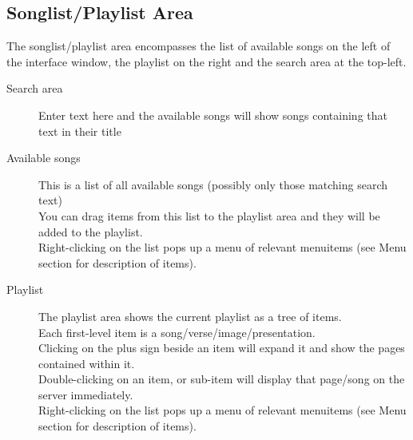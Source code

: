 \documentclass[11pt,twoside]{book}
\begin{document}
\subsection{Songlist/Playlist Area}
	The songlist/playlist area encompasses the list of available songs on the left of the interface window, the playlist on the right and the search area at the top-left.
	\begin{description}
		\item[Search area] Enter text here and the available songs will show songs containing that text in their title
		\item[Available songs] This is a list of all available songs (possibly only those matching search text)\\
			You can drag items from this list to the playlist area and they will be added to the playlist.\\
			Right-clicking on the list pops up a menu of relevant menuitems (see Menu section for description of items).\
		\item[Playlist]
			The playlist area shows the current playlist as a tree of items.\\
			Each first-level item is a song/verse/image/presentation.\\
			Clicking on the plus sign beside an item will expand it and show the pages contained within it.\\
			Double-clicking on an item, or sub-item will display that page/song on the server immediately.\\
			Right-clicking on the list pops up a menu of relevant menuitems (see Menu section for description of items).\
	\end{description}
\end{document}
